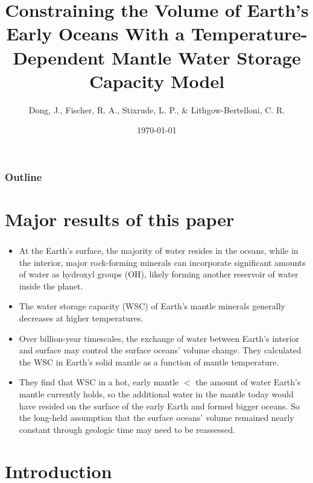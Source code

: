 \documentclass[aspectratio=1610]{beamer}
\title{Constraining the Volume of Earth's Early Oceans With a Temperature-Dependent Mantle Water Storage Capacity Model}
\author{Dong, J., Fischer, R. A., Stixrude, L. P., & Lithgow-Bertelloni, C. R.}
\institute{Columbia University}
\date{\today}
\begin{document}
\begin{frame}
      \titlepage
\end{frame}

\begin{frame}
      \frametitle{Outline}
      \tableofcontents
\end{frame}

\section{Major results of this paper}

\begin{frame}
      \frametitle{\secname}
      \begin{itemize}
            \item At the Earth's surface, the majority of water resides in the oceans, while
                  in the interior, major rock-forming minerals can incorporate significant
                  amounts of water as hydroxyl groups (OH), likely forming another reservoir
                  of water inside the planet.
            \item The water storage capacity (WSC) of Earth's mantle minerals generally
                  decreases at higher temperatures.
            \item Over billion-year timescales, the exchange of water between Earth's
                  interior and surface may control the surface oceans' volume change. They
                  calculated the WSC in Earth's solid mantle as a function of mantle
                  temperature.
            \item They find that WSC in a hot, early mantle $<$ the amount of water Earth's
                  mantle currently holds, so the additional water in the mantle today would
                  have resided on the surface of the early Earth and formed bigger oceans.
                  So the long-held assumption that the surface oceans' volume remained
                  nearly constant through geologic time may need to be reassessed.
      \end{itemize}
\end{frame}

\section{Introduction}
\end{document}
